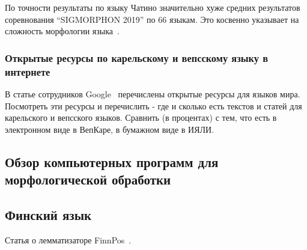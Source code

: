 \bigskip
По точности результаты по языку Чатино значительно хуже
средних результатов соревнования ``SIGMORPHON 2019'' по 66 языкам.
Это косвенно указывает на сложность морфологии языка~\cite[2822]{Cruz-Anastasopoulos-Stump2020Chatino}.


\subsubsection{Открытые ресурсы по карельскому и вепсскому языку в интернете} \label{sect_open_krl_vep_inet}

В статье сотрудников Google~\cite{Prasad2018} перечислены открытые ресурсы для языков мира.
Посмотреть эти ресурсы и перечислить - где и сколько есть текстов и статей
для карельского и вепсского языков. Сравнить (в процентах) с тем, что есть
в электронном виде в ВепКаре, в бумажном виде в ИЯЛИ.








\subsection{Обзор компьютерных программ для морфологической обработки}

\subsection{Финский язык}\label{sect_review_fin}

Статья о лемматизаторе FinnPos~\cite{silfverberg2016finnpos}.

